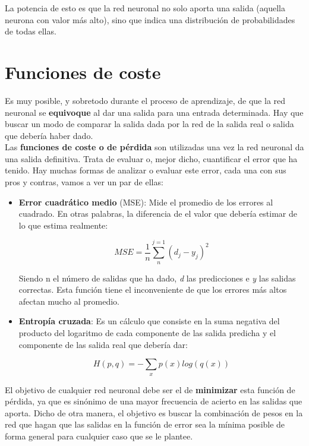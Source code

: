 \documentclass[11pt,fleqn]{book} %
\begin{document}
La potencia de esto es que la red neuronal no solo aporta una salida (aquella neurona con valor más alto), sino que indica una distribución de probabilidades de todas ellas. 

\section{Funciones de coste}\label{sec:funcioncoste} 

Es muy posible, y sobretodo durante el proceso de aprendizaje, de que la red neuronal se \textbf{equivoque} al dar una salida para una entrada determinada. Hay que buscar un modo de comparar la salida dada por la red de la salida real o salida que debería haber dado. \\

Las \textbf{funciones de coste o de pérdida} son utilizadas una vez la red neuronal da una salida definitiva. Trata de evaluar o, mejor dicho, cuantificar el error que ha tenido. Hay muchas formas de analizar o evaluar este error, cada una con sus pros y contras, vamos a ver un par de ellas:\\

\begin{itemize}
	\item \textbf{Error cuadrático medio} (MSE): Mide el promedio de los errores al cuadrado. En otras palabras, la diferencia de el valor que debería estimar de lo que estima realmente:
	
	\begin{equation}
	MSE = \frac{1}{n} \sum_n^{j=1}{(d_j - y_j)^2}
	\end{equation}
	
	Siendo n el número de salidas que ha dado, \textit{d} las predicciones e \textit{y} las salidas correctas. Esta función tiene el inconveniente de que los errores más altos afectan mucho al promedio. \\
	
	\item \textbf{Entropía cruzada}: Es un cálculo que consiste en la suma negativa del producto del logaritmo de cada componente de las salida predicha y el componente de las salida real que debería dar:
	
	\begin{equation}
	H(p,q) = -\sum_x p(x)log(q(x))
	\end{equation}
	
\end{itemize}

El objetivo de cualquier red neuronal debe ser el de \textbf{minimizar} esta función de pérdida, ya que es sinónimo de una mayor frecuencia de acierto en las salidas que aporta. Dicho de otra manera, el objetivo es buscar la combinación de pesos en la red que hagan que las salidas en la función de error sea la mínima posible de forma general para cualquier caso que se le plantee. \\ 
\end{document}
